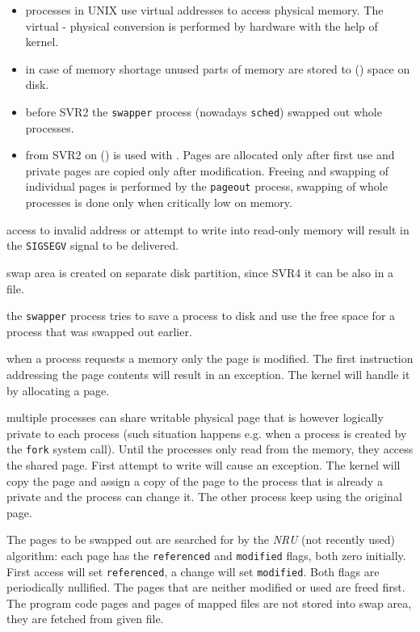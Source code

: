 
\begin{slide}
\begin{itemize}
\item processes in UNIX use virtual addresses to access physical memory.
The virtual - physical conversion is performed by hardware with the help
of kernel.
\item in case of memory shortage unused parts of memory are stored to
() space on disk.
\item before SVR2 the \texttt{swapper} process (nowadays
\texttt{sched}) swapped out whole processes.
\item from SVR2 on () is used with .
Pages are allocated only after first use and private pages are copied only
after modification. Freeing and swapping of individual pages is performed
by the \texttt{pageout} process, swapping of whole processes is done only
when critically low on memory.
\end{itemize}
\end{slide}

\begin{description}
\item[address translation:] access to invalid address or attempt to write into
read-only memory will result in the \texttt{SIGSEGV} signal to be delivered.
\item[swap:] swap area is created on separate disk partition, since
SVR4 it can be also in a file.
\item[swapper:] the \texttt{swapper} process tries to save a process
to disk and use the free space for a process that was swapped out earlier.
\item[demand paging:] when a process requests a memory only the page is
modified. The first instruction addressing the page contents will result in an
exception. The kernel will handle it by allocating a page.
\item[copy-on-write:] multiple processes can share writable physical page that
is however logically private to each process (such situation happens e.g. when a
process is created by the \texttt{fork} system call). Until the processes only
read from the memory, they access the shared page. First attempt to write will
cause an exception. The kernel will copy the page and assign a copy of the
page to the process that is already a private and the process can change it.
The other process keep using the original page.
\item The pages to be swapped out are searched for by the \emph{NRU} (not
recently used) algorithm: each page has the \texttt{referenced} and
\texttt{modified} flags, both zero initially. First access will set
\texttt{referenced}, a change will set \texttt{modified}.
Both flags are periodically nullified. The pages that are neither modified or
used are freed first. The program code pages and pages of mapped files are not
stored into swap area, they are fetched from given file.
\end{description}


\endinput

